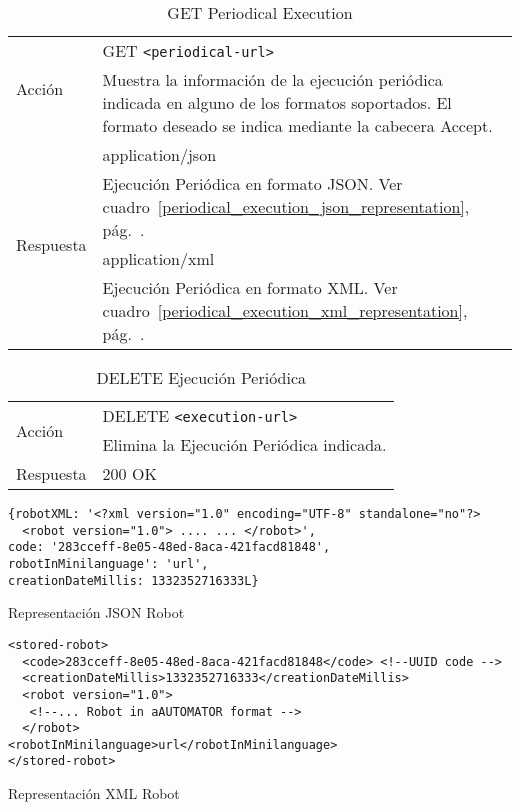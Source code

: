 \begin{table}
\begin{tabularx}{\textwidth}{l X}
\multirow{2}{*}{Acción}
 & GET \verb+<periodical-url>+ \\
 & Muestra la información de la ejecución periódica indicada en alguno de los
formatos soportados. El formato deseado se indica mediante la cabecera Accept.\\ \hline
\multirow{4}{*}{Respuesta}
& application/json \\
& Ejecución Periódica en formato JSON. Ver
cuadro~\ref{periodical_execution_json_representation}, pág.~\pageref{periodical_execution_json_representation}.\\ \cline{2-2}
& application/xml \\
& Ejecución Periódica en formato XML. Ver
cuadro~\ref{periodical_execution_xml_representation}, pág.~\pageref{periodical_execution_xml_representation}. \\
\end{tabularx}
\caption{GET Periodical Execution}
\label{get_periodical_execution}
\end{table}

\begin{table}
\begin{tabularx}{\textwidth}{l X}
\multirow{2}{*}{Acción}
 & DELETE \verb+<execution-url>+\\
& Elimina la Ejecución Periódica indicada.\\ \hline
\multirow{1}{*}{Respuesta}
 & 200 OK \\
\end{tabularx}
\caption{DELETE Ejecución Periódica}
\label{delete_periodical_execution}
\end{table}

\begin{table}
\begin{verbatim}
{robotXML: '<?xml version="1.0" encoding="UTF-8" standalone="no"?>
  <robot version="1.0"> .... ... </robot>',
code: '283cceff-8e05-48ed-8aca-421facd81848',
robotInMinilanguage': 'url',
creationDateMillis: 1332352716333L}
\end{verbatim}
\caption{Representación JSON Robot}
\label{robot_json_representation}
\end{table}

\begin{table}
\begin{verbatim}
<stored-robot>
  <code>283cceff-8e05-48ed-8aca-421facd81848</code> <!--UUID code -->
  <creationDateMillis>1332352716333</creationDateMillis>
  <robot version="1.0">
   <!--... Robot in aAUTOMATOR format -->
  </robot>
<robotInMinilanguage>url</robotInMinilanguage>
</stored-robot>
\end{verbatim}
\caption{Representación XML Robot}
\label{robot_xml_representation}
\end{table}

